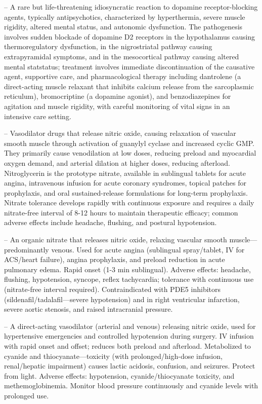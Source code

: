 -- A rare but life-threatening idiosyncratic reaction to dopamine receptor-blocking agents, typically antipsychotics, characterized by hyperthermia, severe muscle rigidity, altered mental status, and autonomic dysfunction. The pathogenesis involves sudden blockade of dopamine D2 receptors in the hypothalamus causing thermoregulatory dysfunction, in the nigrostriatal pathway causing extrapyramidal symptoms, and in the mesocortical pathway causing altered mental statstatus; treatment involves immediate discontinuation of the causative agent, supportive care, and pharmacological therapy including dantrolene (a direct-acting muscle relaxant that inhibits calcium release from the sarcoplasmic reticulum), bromocriptine (a dopamine agonist), and benzodiazepines for agitation and muscle rigidity, with careful monitoring of vital signs in an intensive care setting.

-- Vasodilator drugs that release nitric oxide, causing relaxation of vascular smooth muscle through activation of guanylyl cyclase and increased cyclic GMP. They primarily cause venodilation at low doses, reducing preload and myocardial oxygen demand, and arterial dilation at higher doses, reducing afterload. Nitroglycerin is the prototype nitrate, available in sublingual tablets for acute angina, intravenous infusion for acute coronary syndromes, topical patches for prophylaxis, and oral sustained-release formulations for long-term prophylaxis. Nitrate tolerance develops rapidly with continuous exposure and requires a daily nitrate-free interval of 8-12 hours to maintain therapeutic efficacy; common adverse effects include headache, flushing, and postural hypotension.


-- An organic nitrate that releases nitric oxide, relaxing vascular smooth muscle—predominantly venous. Used for acute angina (sublingual spray/tablet, IV for ACS/heart failure), angina prophylaxis, and preload reduction in acute pulmonary edema. Rapid onset (1-3 min sublingual). Adverse effects: headache, flushing, hypotension, syncope, reflex tachycardia; tolerance with continuous use (nitrate-free interval required). Contraindicated with PDE5 inhibitors (sildenafil/tadalafil—severe hypotension) and in right ventricular infarction, severe aortic stenosis, and raised intracranial pressure.

-- A direct-acting vasodilator (arterial and venous) releasing nitric oxide, used for hypertensive emergencies and controlled hypotension during surgery. IV infusion with rapid onset and offset; reduces both preload and afterload. Metabolized to cyanide and thiocyanate—toxicity (with prolonged/high-dose infusion, renal/hepatic impairment) causes lactic acidosis, confusion, and seizures. Protect from light. Adverse effects: hypotension, cyanide/thiocyanate toxicity, and methemoglobinemia. Monitor blood pressure continuously and cyanide levels with prolonged use.

